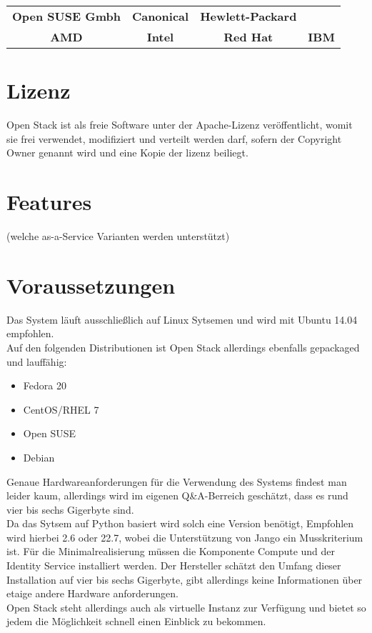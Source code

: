 \documentclass[a4paper,nochapterprefix,ngerman,12pt]{scrreprt}
\begin{document}
\begin{table}[h]
\begin{tabular}{cccc}
\textbf{Open  SUSE Gmbh} & \textbf{Canonical} & \textbf{Hewlett-Packard} &              \\
\textbf{AMD}             & \textbf{Intel}     & \textbf{Red Hat}         & \textbf{IBM}
\end{tabular}
\end{table}
\section{Lizenz}
Open Stack ist als freie Software unter der Apache-Lizenz veröffentlicht, womit sie frei verwendet, modifiziert und verteilt werden darf, sofern der Copyright Owner genannt wird und eine Kopie der lizenz beiliegt.
\section{Features}
(welche as-a-Service Varianten werden unterstützt)
\section{Voraussetzungen}
Das System läuft ausschließlich auf Linux Sytsemen und wird mit Ubuntu 14.04 empfohlen.\\
Auf den folgenden Distributionen ist Open Stack allerdings ebenfalls gepackaged und lauffähig:
\begin{itemize}
	\item Fedora 20
	\item CentOS/RHEL 7
	\item Open SUSE
	\item Debian
\end{itemize}
Genaue Hardwareanforderungen für die Verwendung des Systems findest man leider kaum, allerdings wird im eigenen Q&A-Berreich geschätzt, dass es rund vier bis sechs Gigerbyte sind.\\
Da das Sytsem auf Python basiert wird solch eine Version benötigt, Empfohlen wird hierbei 2.6 oder 22.7, wobei die Unterstützung von Jango ein Musskriterium ist.
Für die Minimalrealisierung müssen die Komponente Compute und der Identity Service installiert werden. Der Hersteller schätzt den Umfang dieser Installation auf vier bis sechs Gigerbyte, gibt allerdings keine Informationen über etaige andere Hardware anforderungen.\\
Open Stack steht allerdings auch als virtuelle Instanz zur Verfügung und bietet so jedem die Möglichkeit schnell einen Einblick zu bekommen.
\end{document}
